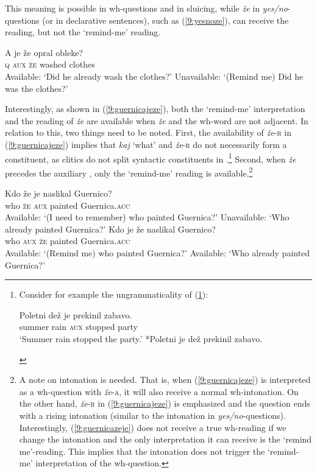 \documentclass[output=paper,modfonts,newtxmath,hidelinks]{langscibook}
\begin{document}
\noindent This meaning is possible in wh-questions and in sluicing, while \textit{že} in \textit{yes/no}-questions (or in declarative sentences), such as (\ref{9:yesnoze}), can receive the  reading, but not the `remind-me' reading. 

\begin{exe}
\ex \label{9:yesnoze}
\gll A je že opral obleke?\\
	\textsc{q} \textsc{aux} \textsc{že} washed clothes\\
	\glt Available: `Did he already wash the clothes?'
\glt Unavailable: `(Remind me) Did he was the clothes?'
\end{exe}

\noindent Interestingly, as shown in (\ref{9:guernicajeze}), both the `remind-me' interpretation and the  reading of \textit{že} are available when \textit{že} and the wh-word are not adjacent. In relation to this, two things need to be noted. First, the availability of \textit{že}-\textsc{r} in (\ref{9:guernicajeze}) implies that \textit{kaj} `what' and \textit{že}-\textsc{r} do not necessarily form a constituent, as clitics do not split syntactic constituents in .\footnote{Consider for example the ungrammaticality of (\ref{9:ib}):
\ea
\begin{xlista}
\ex
{
\gll	Poletni dež je prekinil zabavo.\\
 summer rain \textsc{aux} stopped party\\
\trans `Summer rain stopped the party.' 
}
\ex
{
 *Poletni je dež prekinil zabavo.
}
\label{9:ib}
\end{xlista}
\zlast} 
Second, when \textit{že} precedes the auxiliary , only the `remind-me' reading is available.\footnote{A note on intonation is needed. That is, when (\ref{9:guernicajeze}) is interpreted as a wh-question with \textit{že}-\textsc{a}, it will also receive a normal wh-intonation. On the other hand, \textit{že}-\textsc{r} in (\ref{9:guernicajeze}) is emphasized and the question ends with a rising intonation (similar to the intonation in \textit{yes/no}-questions). Interestingly, (\ref{9:guernicazeje}) does not receive a true wh-reading if we change the intonation and the only interpretation it can receive is the `remind me'-reading. This implies that the intonation does not trigger the `remind-me' interpretation of the wh-question.} 

\begin{exe}
\ex 
\begin{xlist}
\ex \label{9:guernicazeje}
\gll Kdo že je naslikal Guernico? \\
		who \textsc{že} \textsc{aux} painted Guernica.\textsc{acc}\\
\trans  Available: `(I need to remember) who painted Guernica?'
\trans Unavailable: `Who already painted Guernica?'
\ex \label{9:guernicajeze}
\gll	Kdo je že naslikal Guernico?\\
		who \textsc{aux} \textsc{že} painted Guernica.\textsc{acc}\\
\trans	 Available: `(Remind me) who painted Guernica?'
\trans 	 Available: `Who already painted Guernica?'
\end{xlist}
\end{exe}
\end{document}
